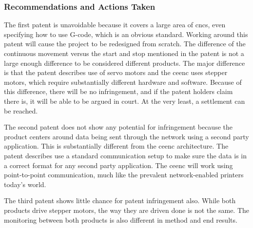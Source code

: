 \subsubsection{Recommendations and Actions Taken}
The first patent is unavoidable because it covers a large area of \gls{cnc}s, even specifying how to use G-code, which is an obvious standard.
Working around this patent will cause the project to be redesigned from scratch.
The difference of the continuous movement versus the start and stop mentioned in the patent is not a large enough difference to be considered different products.
The major difference is that the patent describes use of servo motors and the \gls{ceenc} uses stepper motors, which require substantially different hardware and software.
Because of this difference, there will be no infringement, and if the patent holders claim there is, it will be able to be argued in court. 
At the very least, a settlement can be reached.

The second patent does not show any potential for infringement because the product centers around data being sent through the network using a second party application.
This is substantially different from the \gls{ceenc} architecture.
The patent describes use a standard communication setup to make sure the data is in a correct format for any second party application.
The \gls{ceenc} will work using point-to-point communication, much like the prevalent network-enabled printers today’s world.

The third patent shows little chance for patent infringement also.
While both products drive stepper motors, the way they are driven done is not the same.
The monitoring between both products is also different in method and end results.
